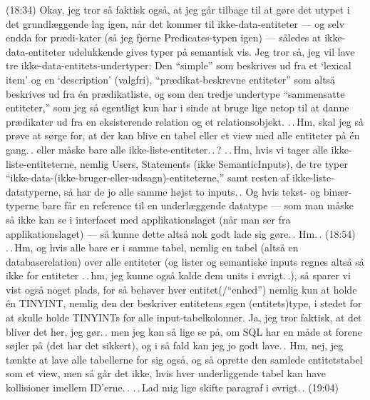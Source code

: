 \documentclass{report}
\begin{document}
(18:34) Okay, jeg tror så faktisk også, at jeg går tilbage til at gøre det utypet i det grundlæggende lag igen, når det kommer til ikke-data-entiteter --- og selv endda for prædi-kater (så jeg fjerne Predicates-typen igen) --- således at ikke-data-entiteter udelukkende gives typer på semantisk vis. Jeg tror så, jeg vil lave tre ikke-data-entitets-undertyper: Den ``simple'' som beskrives ud fra et `lexical item' og en `description' (valgfri), ``prædikat-beskrevne entiteter'' som altså beskrives ud fra én prædikatliste, og som den tredje undertype ``sammensatte entiteter,'' som jeg så egentligt kun har i sinde at bruge lige netop til at danne prædikater ud fra en eksisterende relation og et relationsobjekt. .\,.\,Hm, skal jeg så prøve at sørge for, at der kan blive en tabel eller et view med alle entiteter på én gang.\,. eller måske bare alle ikke-liste-entiteter.\,.\,? .\,.\,Hm, hvis vi tager alle ikke-liste-entiteterne, nemlig Users, Statements (ikke SemanticInputs), de tre typer ``ikke-data-(ikke-bruger-eller-udsagn)-entiteterne,'' samt resten af ikke-liste-datatyperne, så har de jo alle samme højst to inputs.\,. Og hvis tekst- og binær-typerne bare får en reference til en underlæggende datatype --- som man måske så ikke kan se i interfacet med applikationslaget (når man ser fra applikationslaget) --- så kunne dette altså nok godt lade sig gøre.\,. Hm.\,. (18:54) .\,.\,Hm, og hvis alle bare er i samme tabel, nemlig en tabel (altså en databaserelation) over alle entiteter (og lister og semantiske inputs regnes altså så ikke for entiteter .\,.\,hm, jeg kunne også kalde dem units i øvrigt.\,.), så sparer vi vist også noget plads, for så behøver hver entitet(/``enhed'') nemlig kun at holde én TINYINT, nemlig den der beskriver entitetens egen (entitets)type, i stedet for at skulle holde TINYINTs for alle input-tabelkolonner. Ja, jeg tror faktisk, at det bliver det her, jeg gør.\,. men jeg kan så lige se på, om SQL har en måde at forene søjler på (det har det sikkert), og i så fald kan jeg jo godt lave.\,. Hm, nej, jeg tænkte at lave alle tabellerne for sig også, og så oprette den samlede entitetstabel som et view, men så går det ikke, hvis hver underliggende tabel kan have kollisioner imellem ID'erne.\,. .\,.\,Lad mig lige skifte paragraf i øvrigt.\,. (19:04)
\end{document}
